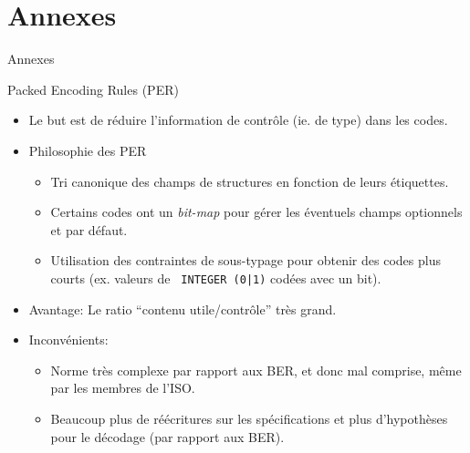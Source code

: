 \section{Annexes}

\begin{slide}
\begin{block} {Annexes} \end{block}
\end{slide}


\begin{slide}
\begin{block} {Packed Encoding Rules (PER)} \end{block}

\begin{itemize}
  \item Le but est de réduire l'information de contrôle (ie. de type)
        dans les codes.

  \item Philosophie des PER
        \begin{itemize}
           \item Tri canonique des champs de structures en fonction de
                 leurs étiquettes.
           \item Certains codes ont un {\em bit-map} pour gérer les
                 éventuels champs optionnels et par défaut.
           \item Utilisation des contraintes de sous-typage pour
                 obtenir des codes plus courts (ex. valeurs de {\tt
                 INTEGER (0|1)} codées avec un bit).
        \end{itemize}
\end{itemize}

\continued

\begin{itemize}
  \item Avantage: Le ratio ``contenu utile/contrôle'' très grand.

  \item Inconvénients:
        \begin{itemize}
           \item Norme très complexe par rapport aux BER, et donc mal
                 comprise, même par les membres de l'ISO.

           \item Beaucoup plus de réécritures sur les spécifications et
                 plus d'hypothèses pour le décodage (par rapport aux
                 BER).
        \end{itemize}
\end{itemize}

\end{slide}




